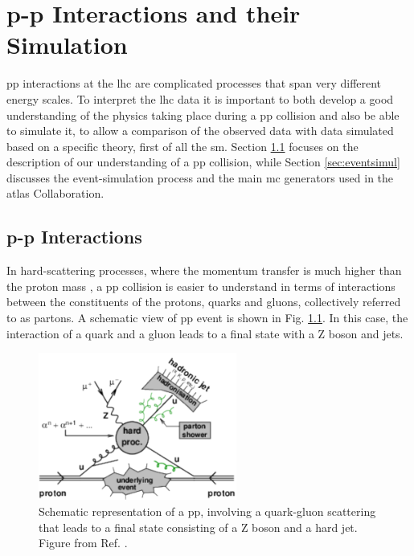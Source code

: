 \chapter{p-p Interactions and their Simulation}
\label{chap:event:MC}


\gls{pp} interactions at the \gls{lhc} are complicated processes that span very different energy scales. 
To interpret the \gls{lhc} data it is important to both 
develop a good understanding of the physics taking place during a \gls{pp} collision and also be able to simulate 
it, to allow a comparison of the observed data with data simulated based on a specific theory, first of all the \gls{sm}.
Section \ref{sec:ppint} focuses on the description of our understanding of a \gls{pp} collision, while Section \ref{sec:eventsimul} 
discusses the event-simulation process and the main \gls{mc} generators used in the \gls{atlas} Collaboration. 



\section{p-p Interactions}
\label{sec:ppint}

In hard-scattering processes, where the momentum transfer is much higher than the proton mass \cite{Butterworth:2012fj}, 
a \gls{pp} collision is easier to understand in terms of interactions between the constituents of the protons, quarks and gluons, 
collectively referred to as partons. A schematic view of \gls{pp} event is shown in Fig. \ref{fig:sim:pp2}. In this case, the interaction of a quark and a gluon leads to a final state with a Z boson and jets. 

\begin{figure}[h]
\begin{center}
    \includegraphics[width=0.58\textwidth]{figures/simul/ppcoll2}
\end{center}
 \caption{Schematic representation of a \gls{pp}, involving a quark-gluon scattering that leads to a final state consisting of a Z boson and a hard jet. Figure from Ref. \cite{Butterworth:2012fj}.}
  \label{fig:sim:pp2}
\end{figure}

